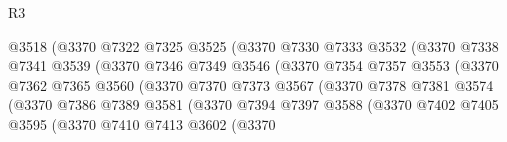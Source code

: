 \begin{lexlean}{R3}
\begin{coremodule}
                                  @3518
                                  (@3370
                                    @7322
                                    @7325
                                    @3525
                                    (@3370
                                      @7330
                                      @7333
                                      @3532
                                      (@3370
                                        @7338
                                        @7341
                                        @3539
                                        (@3370
                                          @7346
                                          @7349
                                          @3546
                                          (@3370
                                            @7354
                                            @7357
                                            @3553
                                            (@3370
                                              @7362
                                              @7365
                                              @3560
                                              (@3370
                                                @7370
                                                @7373
                                                @3567
                                                (@3370
                                                  @7378
                                                  @7381
                                                  @3574
                                                  (@3370
                                                    @7386
                                                    @7389
                                                    @3581
                                                    (@3370
                                                      @7394
                                                      @7397
                                                      @3588
                                                      (@3370
                                                        @7402
                                                        @7405
                                                        @3595
                                                        (@3370
                                                          @7410
                                                          @7413
                                                          @3602
                                                          (@3370

\end{coremodule}
\end{lexlean}
